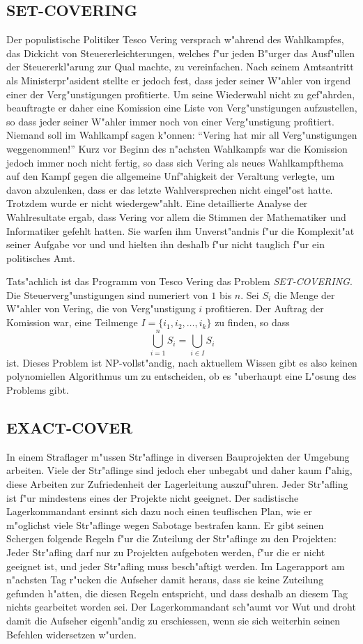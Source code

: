 \subsection{SET-COVERING}
Der populistische Politiker Tesco Vering versprach w"ahrend des
Wahlkampfes, das Dickicht von Steuererleichterungen, welches
f"ur jeden B"urger das Ausf"ullen der Steuererkl"arung zur Qual
machte, zu vereinfachen.
Nach seinem Amtsantritt als Ministerpr"asident 
stellte er jedoch fest, dass jeder seiner W"ahler von irgend einer
der Verg"unstigungen profitierte. Um seine Wiederwahl nicht
zu gef"ahrden, beauftragte er daher eine Komission eine Liste
von Verg"unstigungen aufzustellen, so dass jeder seiner W"ahler
immer noch von einer Verg"unstigung profitiert. Niemand soll im
Wahlkampf sagen k"onnen: ``Vering hat mir all Verg"unstigungen weggenommen!''
Kurz vor Beginn des n"achsten Wahlkampfs war die Komission jedoch
immer noch nicht fertig, so dass sich Vering als neues Wahlkampfthema
auf den Kampf gegen die allgemeine Unf"ahigkeit der Veraltung verlegte, um davon
abzulenken, dass er das letzte Wahlversprechen nicht eingel"ost hatte.
Trotzdem wurde er nicht wiedergew"ahlt. Eine detaillierte Analyse der
Wahlresultate ergab, dass Vering vor allem die Stimmen der Mathematiker und
Informatiker gefehlt hatten.
Sie warfen ihm Unverst"andnis f"ur die Komplexit"at seiner Aufgabe vor und 
und hielten ihn deshalb f"ur nicht tauglich f"ur ein politisches Amt.

\medskip

Tats"achlich ist das Programm von Tesco Vering das Problem {\it SET-COVERING}.
Die Steuerverg"unstigungen sind numeriert von $1$ bis $n$.
Sei $S_i$ die Menge der W"ahler von Vering, die von Verg"unstigung $i$
profitieren. Der Auftrag der Komission war, eine Teilmenge
$I=\{i_1,i_2,\dots,i_k\}$ zu finden, so dass
\[
\bigcup_{i=1}^nS_i=\bigcup_{i\in I}S_i
\]
ist.
Dieses Problem ist NP-vollst"andig, nach aktuellem Wissen gibt
es also keinen polynomiellen Algorithmus um zu entscheiden, ob es
"uberhaupt eine L"osung des Problems gibt.

\subsection{EXACT-COVER}
In einem Straflager m"ussen Str"aflinge in diversen Bauprojekten
der Umgebung arbeiten.
Viele der Str"aflinge sind jedoch eher unbegabt und daher kaum
f"ahig, diese Arbeiten zur Zufriedenheit der Lagerleitung auszuf"uhren.
Jeder Str"afling ist f"ur mindestens eines der Projekte nicht geeignet.
Der sadistische Lagerkommandant ersinnt sich dazu noch einen teuflischen
Plan, wie er m"oglichst viele Str"aflinge wegen Sabotage bestrafen kann.
Er gibt seinen Schergen folgende Regeln f"ur die Zuteilung der Str"aflinge
zu den Projekten: Jeder Str"afling darf nur zu Projekten aufgeboten werden,
f"ur die er nicht geeignet ist, und jeder Str"afling muss besch"aftigt
werden.
Im Lagerapport am n"achsten Tag r"ucken die Aufseher damit heraus, dass
sie keine Zuteilung gefunden h"atten, die diesen Regeln entspricht, und
dass deshalb an diesem Tag nichts gearbeitet worden sei.
Der Lagerkommandant sch"aumt vor Wut und droht damit die Aufseher eigenh"andig
zu erschiessen, wenn sie sich weiterhin seinen Befehlen widersetzen
w"urden.

